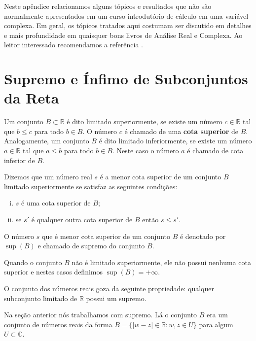 \begin{subappendices}

Neste apêndice relacionamos alguns tópicos e resultados que não são normalmente apresentados
em um curso introdutório de cálculo em uma variável complexa. Em geral, os tópicos tratados
aqui costumam ser discutido em detalhes e mais profundidade em quaisquer bons livros de 
Análise Real e Complexa. Ao leitor interessado recomendamos a referência \cite{MR3331079}.

\section{Supremo e Ínfimo de Subconjuntos da Reta}\label{Apend-sup-inf}

Um conjunto $B\subset \mathbb{R}$ é dito limitado superiormente, se existe um número $c\in\mathbb{R}$
tal que $b\leqslant c$ para todo $b\in B$. O número $c$ é chamado de uma {\bf cota superior} 
de $B$. 
Analogamente, um conjunto $B$ é dito limitado inferiormente, se existe um número $a\in\mathbb{R}$ 
tal que $a\leqslant b$ para todo $b\in B$. Neste caso o número $a$ é chamado de cota inferior
de $B$.

\begin{definicao}[Supremo]\label{def-sup}
Dizemos que um número real $s$ é a menor cota superior de um conjunto $B$ limitado superiormente se satisfaz as seguintes condições:
\begin{enumerate}[i)]
\item $s$ é uma cota superior de $B$; 
\item  se $s'$ é qualquer outra cota superior de $B$ então $s\leq s'$. 
\end{enumerate}
O número $s$ que é menor cota superior de um conjunto $B$ é denotado 
por $\sup(B)$ e chamado de supremo do conjunto $B$.
\end{definicao}
Quando o conjunto $B$ não é limitado superiormente, ele não possui nenhuma cota superior e nestes casos definimos $\sup(B)=+\infty$.

O conjunto dos números reais goza da seguinte propriedade: qualquer subconjunto limitado de $\mathbb{R}$
possui um supremo. 

Na seção anterior nós trabalhamos com supremo. Lá o conjunto $B$ era um 
conjunto de números reais da forma 
$B= \{|w-z|\in\mathbb{R} : w,z\in U\}$ para algum $U\subset \mathbb{C}$.


\end{subappendices}
